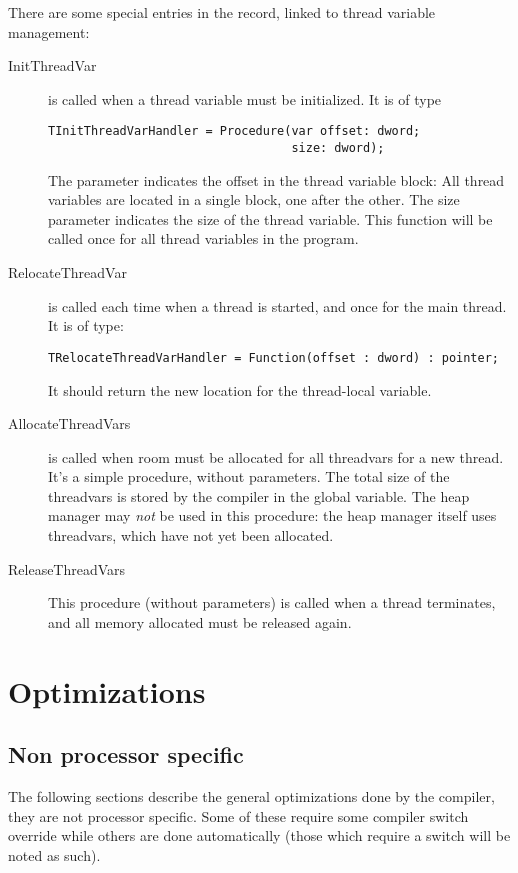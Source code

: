 There are some special entries in the record, linked to thread variable
management:
\begin{description}
\item[InitThreadVar] is called when a thread variable must be initialized.
It is of type
\begin{verbatim}
TInitThreadVarHandler = Procedure(var offset: dword;
                                  size: dword);
\end{verbatim}
The  parameter indicates the offset in the thread variable
block: All thread variables are located in a single block, one after the
other. The size parameter indicates the size of the thread variable. This
function will be called once for all thread variables in the program.
\item[RelocateThreadVar] is called each time when a thread is started, and
once for the main thread. It is of type:
\begin{verbatim}
TRelocateThreadVarHandler = Function(offset : dword) : pointer;
\end{verbatim}
It should return the new location for the thread-local variable.
\item[AllocateThreadVars] is called when room must be allocated for all
threadvars for a new thread. It's a simple procedure, without parameters. 
The total size of the threadvars is stored by the compiler in the  global variable.
The heap manager may {\em not} be used in this procedure: the heap manager
itself uses threadvars, which have not yet been allocated.
\item[ReleaseThreadVars] This procedure (without parameters) is called when
a thread terminates, and all memory allocated must be released again.
\end{description}

\chapter{Optimizations}

\section{Non processor specific}

The following sections describe the general optimizations
done by the compiler, they are not processor specific. Some
of these require some compiler switch override while others are done
automatically (those which require a switch will be noted as such).

